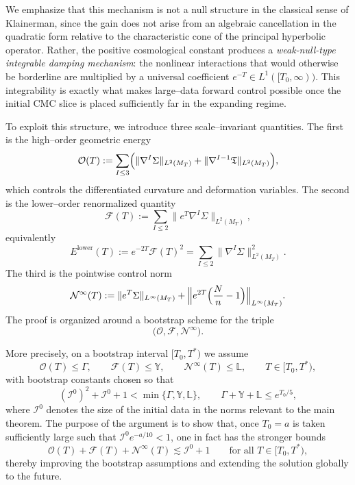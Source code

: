 \documentclass{amsart}
\begin{document}
\medskip

\noindent We emphasize that this mechanism is not a null structure in the classical sense of Klainerman, since the gain does not arise from an algebraic cancellation in the quadratic form relative to the characteristic cone of the principal hyperbolic operator.  Rather, the positive cosmological constant produces a \emph{weak-null-type integrable damping mechanism}: the nonlinear interactions that would otherwise be borderline are multiplied by a universal coefficient \(e^{-T}\in L^1([T_0,\infty))\).  This integrability is exactly what makes large--data forward control possible once the initial CMC slice is placed sufficiently far in the expanding regime.

\medskip

\noindent To exploit this structure, we introduce three scale--invariant quantities.  The first is the high--order geometric energy
\[
\mathcal O(T)
 := \sum_{I\le 3}
 \Bigl(
   \|\nabla^I\Sigma\|_{L^2(M_T)}
   + \|\nabla^{I-1}\mathfrak T\|_{L^2(M_T)}
 \Bigr),
\]
which controls the differentiated curvature and deformation variables.  The second is the lower--order renormalized quantity
\[
\mathcal F(T)
 := \sum_{I\le 2}\|e^T\nabla^I\Sigma\|_{L^2(M_T)},
\]
equivalently
\[
E^{\mathrm{lower}}(T)
 := e^{-2T}\mathcal F(T)^2
 = \sum_{I\le 2}\|\nabla^I\Sigma\|_{L^2(M_T)}^2.
\]
The third is the pointwise control norm
\[
\mathcal N^\infty(T)
 := \|e^T\Sigma\|_{L^\infty(M_T)}
   + \Bigl\|e^{2T}\Bigl(\frac{N}{n}-1\Bigr)\Bigr\|_{L^\infty(M_T)}.
\]
The proof is organized around a bootstrap scheme for the triple
\[
\bigl(\mathcal O,\mathcal F,\mathcal N^\infty\bigr).
\]

\medskip

\noindent More precisely, on a bootstrap interval \([T_0,T^\ast)\) we assume
\[
\mathcal O(T)\le \Gamma,
\qquad
\mathcal F(T)\le \mathds Y,
\qquad
\mathcal N^\infty(T)\le \mathds L,
\qquad
T\in[T_0,T^\ast),
\]
with bootstrap constants chosen so that
\[
(\mathcal I^0)^2+\mathcal I^0+1<\min\{\Gamma,\mathds Y,\mathds L\},
\qquad
\Gamma+\mathds Y+\mathds L\le e^{T_0/5},
\]
where \(\mathcal I^0\) denotes the size of the initial data in the norms relevant to the main theorem.  The purpose of the argument is to show that, once \(T_0=a\) is taken sufficiently large such that \(\mathcal I^0e^{-a/10}<1\), one in fact has the stronger bounds
\[
\mathcal O(T)+\mathcal F(T)+\mathcal N^\infty(T)
 \lesssim \mathcal I^0+1
\qquad\text{for all }T\in[T_0,T^\ast),
\]
thereby improving the bootstrap assumptions and extending the solution globally to the future.
\end{document}
